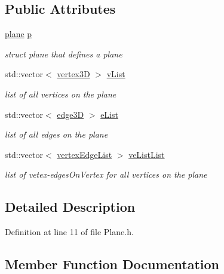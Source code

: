 \subsection*{Public Attributes}
\begin{DoxyCompactItemize}
\item 
\mbox{\hyperlink{structplane}{plane}} \mbox{\hyperlink{class_plane_a65c157cab5de9f5c3c1ecd5b7770badc}{p}}
\begin{DoxyCompactList}\small\item\em struct plane that defines a plane \end{DoxyCompactList}\item 
std\+::vector$<$ \mbox{\hyperlink{structvertex3_d}{vertex3D}} $>$ \mbox{\hyperlink{class_plane_a9badd6fb24525ce9605a3f6a5bb0d770}{v\+List}}
\begin{DoxyCompactList}\small\item\em list of all vertices on the plane \end{DoxyCompactList}\item 
std\+::vector$<$ \mbox{\hyperlink{structedge3_d}{edge3D}} $>$ \mbox{\hyperlink{class_plane_a71c027d1ed3593af105dcbdee9e1b11f}{e\+List}}
\begin{DoxyCompactList}\small\item\em list of all edges on the plane \end{DoxyCompactList}\item 
std\+::vector$<$ \mbox{\hyperlink{structvertex_edge_list}{vertex\+Edge\+List}} $>$ \mbox{\hyperlink{class_plane_a83494ec7ac0ca05a7fb8e8340c3a99fc}{ve\+List\+List}}
\begin{DoxyCompactList}\small\item\em list of vetex-\/edges\+On\+Vertex for all vertices on the plane \end{DoxyCompactList}\end{DoxyCompactItemize}


\subsection{Detailed Description}


Definition at line 11 of file Plane.\+h.



\subsection{Member Function Documentation}
\mbox{\label{class_plane_ad2708bd985955c7f978a191f4e9249ac}} 
